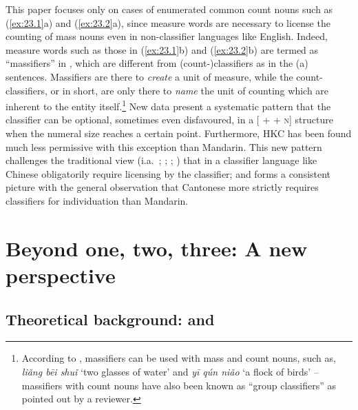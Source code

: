 \documentclass[output=paper]{langsci/langscibook}
\begin{document}
This paper focuses only on cases of enumerated common count nouns such as
(\ref{ex:23.1}a) and (\ref{ex:23.2}a), since measure words are
necessary to license the counting of mass nouns even in non-classifier
languages like English. Indeed, measure words such as those in
(\ref{ex:23.1}b) and (\ref{ex:23.2}b) are termed as
\enquote{massifiers} in \citet{ChengSybesma1998}, which are different from
(count-)classifiers as in the (a) sentences.  Massifiers are there to
\emph{create} a unit of measure, while the count-classifiers, or
 in short, are only there to \emph{name} the unit of counting
which are inherent to the entity itself.\footnote{According to
    \textcite{ChengSybesma1998}, massifiers can be used with mass and count
    nouns, such as, \emph{liǎng bēi shuǐ} \enquote*{two glasses of water} and
    \emph{yī qún niǎo} \enquote*{a flock of birds} -- massifiers with count
nouns have also been known as \enquote{group classifiers} as pointed out by a
reviewer.} New data present a systematic pattern that the
classifier can be optional, sometimes even disfavoured, in a
[\Num{} + \Clf{} + \textsc{n}] structure when the numeral size
reaches a certain point. Furthermore, \gls{HKC} has
been found much less permissive with this exception than Mandarin.
This new pattern challenges the traditional view (i.a.~\citealt{Krifka1995};
\citealt{Chierchia1998};
\citealt{ChengSybesma1999,ChengSybesma2005,ChengSybesma2012};
\citealt{Doetjes1996}) that  in a classifier
language like Chinese obligatorily require licensing by the
classifier; and forms a consistent picture with the general
observation that Cantonese more strictly requires classifiers for individuation
than Mandarin.

\section{Beyond one, two, three: A new perspective}

\subsection{Theoretical background: \citet{Krifka1995} and \citet{Chierchia1998}}
\end{document}
